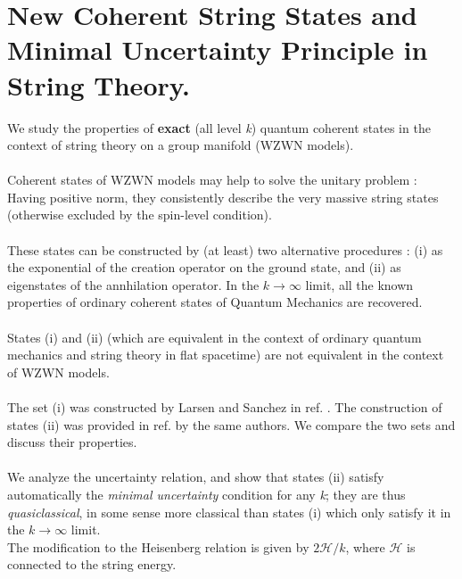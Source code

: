 \documentclass[12pt,a4paper]{article}
\begin{document}
\section{New Coherent String States and Minimal Uncertainty Principle in 
String Theory.}
We study the properties of {\bf exact} (all level {\it k}) quantum coherent 
states in the context of string theory on a group manifold (WZWN models). \\ \\
Coherent states of WZWN models may help to solve the unitary problem : Having 
positive norm, they consistently describe the very massive string states 
(otherwise excluded by the spin-level condition).\\ \\
These states can be constructed by (at least) two alternative procedures : 
(i) as the exponential of the creation operator on the ground state, and (ii) 
as eigenstates of the annhilation operator. In the $ k \rightarrow \infty$ 
limit, all the known properties of ordinary coherent states of Quantum 
Mechanics are recovered. \\ \\
States (i) and (ii) (which are equivalent in the context of ordinary quantum 
mechanics and string theory in flat spacetime) are not equivalent in the 
context of WZWN models.\\ \\ The set (i) was constructed by Larsen and Sanchez 
in ref. \cite{ls}. The construction of states (ii) was provided in ref.  
\cite{ls2} by the same authors. We compare the two sets and discuss their 
properties. \\ \\
We analyze the uncertainty relation, and show that states (ii) satisfy 
automatically the {\it minimal uncertainty} condition for any {\it k}; they 
are thus {\it quasiclassical}, in some sense more classical than states (i) 
which 
only satisfy it in the $ k \rightarrow \infty$ limit.\\ The modification to the Heisenberg relation is given by $2 \mathcal{H}/k$, where $\mathcal{H}$ is connected to the string 
energy.
\end{document}

